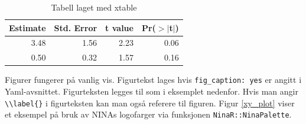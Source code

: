 \documentclass[11pt, a4paper]{article}
\newenvironment{Shaded}{\begin{snugshade}}{\end{snugshade}}
\newcommand{\AttributeTok}[1]{\textcolor[rgb]{0.40,0.45,0.13}{#1}}
\newcommand{\DecValTok}[1]{\textcolor[rgb]{0.68,0.00,0.00}{#1}}
\newcommand{\FunctionTok}[1]{\textcolor[rgb]{0.28,0.35,0.67}{#1}}
\newcommand{\NormalTok}[1]{\textcolor[rgb]{0.00,0.23,0.31}{#1}}
\newcommand{\OtherTok}[1]{\textcolor[rgb]{0.00,0.23,0.31}{#1}}
\newcommand{\SpecialCharTok}[1]{\textcolor[rgb]{0.37,0.37,0.37}{#1}}
\newcommand{\StringTok}[1]{\textcolor[rgb]{0.13,0.47,0.30}{#1}}
\begin{document}
\begin{Shaded}
\end{Shaded}

\begin{table}[ht]
\centering
\begin{tabular}{rrrr}
  \hline
Estimate & Std. Error & t value & Pr($>$$|$t$|$) \\ 
  \hline
3.48 & 1.56 & 2.23 & 0.06 \\ 
  0.50 & 0.32 & 1.57 & 0.16 \\ 
   \hline
\end{tabular}
\caption{Tabell laget med xtable \label{tab1}} 
\end{table}

Figurer fungerer på vanlig vis. Figurtekst lages hvis
\texttt{fig\_caption:\ yes} er angitt i Yaml-avsnittet. Figurteksten
legges til som i eksemplet nedenfor. Hvis man angir
\texttt{\textbackslash{}\textbackslash{}label\{\}} i figurteksten kan
man også referere til figuren. Figur \ref{xy_plot} viser et eksempel på
bruk av NINAs logofarger via funksjonen \texttt{NinaR::NinaPalette}.
\end{document}
